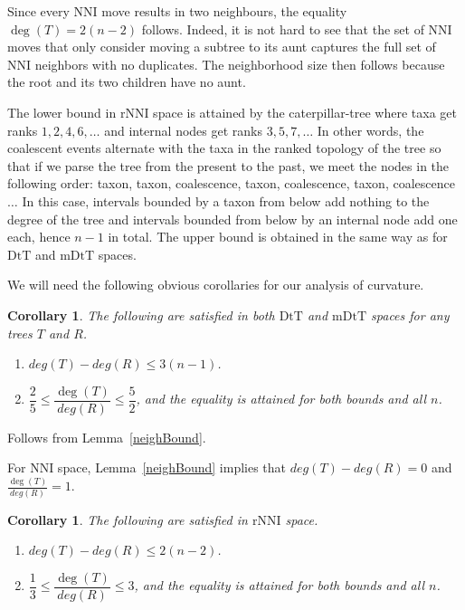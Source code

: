 \documentclass{amsart}
\newtheorem{corollary}[lemma]{Corollary}
\newcommand{\dts}{\mathrm{DtT}}
\newcommand{\nni}{\mathrm{NNI}}
\newcommand{\rnni}{\mathrm{rNNI}}
\newcommand{\mdts}{\mathrm{mDtT}}
\begin{document}
Since every NNI move results in two neighbours, the equality $\deg(T) = 2(n-2)$ follows.
Indeed, it is not hard to see that the set of NNI moves that only consider moving a subtree to its aunt captures the full set of NNI neighbors with no duplicates.
The neighborhood size then follows because the root and its two children have no aunt.

The lower bound in $\rnni$ space is attained by the caterpillar-tree where taxa get ranks $1, 2, 4, 6, \ldots$ and internal nodes get ranks $3, 5, 7, \ldots$
In other words, the coalescent events alternate with the taxa in the ranked topology of the tree so that if we parse the tree from the present to the past, we meet the nodes in the following order: taxon, taxon, coalescence, taxon, coalescence, taxon, coalescence$\ldots$
In this case, intervals bounded by a taxon from below add nothing to the degree of the tree and intervals bounded from below by an internal node add one each, hence $n-1$ in total.
The upper bound is obtained in the same way as for $\dts$ and $\mdts$ spaces.
\endproof

We will need the following obvious corollaries for our analysis of curvature.

\begin{corollary}\label{degreeBounds}
The following are satisfied in both $\dts$ and $\mdts$ spaces for any trees $T$ and $R$.
\begin{enumerate}[(1)]
\item $deg(T)-deg(R) \leq 3(n-1)$.
\item $\dfrac25 \leq \dfrac{\deg(T)}{deg(R)} \leq \dfrac52$, and the equality is attained for both bounds and all $n$.
\end{enumerate}
\end{corollary}

\proof
Follows from Lemma~\ref{neighBound}.
\endproof

For $\nni$ space, Lemma~\ref{neighBound} implies that $deg(T)-deg(R) = 0$ and $\frac{\deg(T)}{deg(R)} = 1$.

\begin{corollary}\label{degreeBoundsNNI}
The following are satisfied in $\rnni$ space.
\begin{enumerate}[(1)]
\item $deg(T)-deg(R) \leq 2(n-2)$.
\item $\dfrac13 \leq \dfrac{\deg(T)}{deg(R)} \leq 3$, and the equality is attained for both bounds and all $n$.
\end{enumerate}
\end{corollary}
\end{document}
